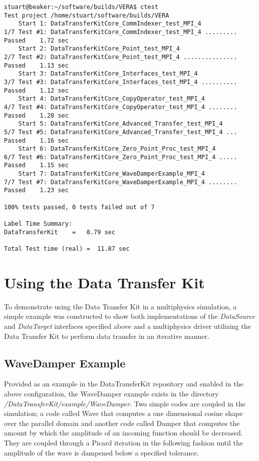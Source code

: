 \documentclass[letterpaper]{article}
\begin{document}
\begin{verbatim}
stuart@beaker:~/software/builds/VERA$ ctest
Test project /home/stuart/software/builds/VERA
    Start 1: DataTransferKitCore_CommIndexer_test_MPI_4
1/7 Test #1: DataTransferKitCore_CommIndexer_test_MPI_4 .........   Passed    1.72 sec
    Start 2: DataTransferKitCore_Point_test_MPI_4
2/7 Test #2: DataTransferKitCore_Point_test_MPI_4 ...............   Passed    1.13 sec
    Start 3: DataTransferKitCore_Interfaces_test_MPI_4
3/7 Test #3: DataTransferKitCore_Interfaces_test_MPI_4 ..........   Passed    1.12 sec
    Start 4: DataTransferKitCore_CopyOperator_test_MPI_4
4/7 Test #4: DataTransferKitCore_CopyOperator_test_MPI_4 ........   Passed    1.28 sec
    Start 5: DataTransferKitCore_Advanced_Transfer_test_MPI_4
5/7 Test #5: DataTransferKitCore_Advanced_Transfer_test_MPI_4 ...   Passed    1.16 sec
    Start 6: DataTransferKitCore_Zero_Point_Proc_test_MPI_4
6/7 Test #6: DataTransferKitCore_Zero_Point_Proc_test_MPI_4 .....   Passed    1.15 sec
    Start 7: DataTransferKitCore_WaveDamperExample_MPI_4
7/7 Test #7: DataTransferKitCore_WaveDamperExample_MPI_4 ........   Passed    1.23 sec

100% tests passed, 0 tests failed out of 7

Label Time Summary:
DataTransferKit    =   8.79 sec

Total Test time (real) =  11.87 sec
\end{verbatim}

\section{Using the Data Transfer Kit}
To demonstrate using the Data Transfer Kit in a multiphysics
simulation, a simple example was constructed to show both
implementations of the {\sl DataSource} and {\sl DataTarget}
interfaces specified above and a multiphysics driver utilizing the
Data Transfer Kit to perform data transfer in an iterative manner. 

\subsection{WaveDamper Example}
Provided as an example in the DataTransferKit repository and enabled in the
above configuration, the WaveDamper example exists in the directory
{\sl /DataTransferKit/example/WaveDamper}. Two simple codes are coupled in the
simulation; a code called Wave that computes a one dimensional cosine
shape over the parallel domain and another code called Damper that
computes the amount by which the amplitude of an incoming function
should be decreased. They are coupled through a Picard iteration in
the following fashion until the amplitude of the wave is dampened
below a specified tolerance.
\end{document}
